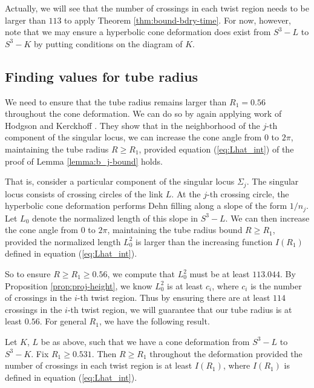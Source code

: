 Actually, we will see that the number of crossings in each twist
region needs to be larger than $113$ to apply Theorem
\ref{thm:bound-bdry-time}.  For now, however, note that we may ensure
a hyperbolic cone deformation does exist from $S^3-L$ to $S^3-K$ by
putting conditions on the diagram of $K$.


\subsection{Finding values for tube radius}
\label{subsec:tube}

We need to ensure that the tube radius remains larger than $R_1 =
0.56$ throughout the cone deformation.  We can do so by again applying
work of Hodgson and Kerckhoff \cite{hk:univ}.  They show that in the
neighborhood of the $j$-th component of the singular locus, we can
increase the cone angle from $0$ to $2\pi$, maintaining the tube
radius $R \geq R_1$, provided equation (\ref{eq:Lhat_int}) of the
proof of Lemma \ref{lemma:b_j-bound} holds.

That is, consider a particular component of the singular locus
$\Sigma_j$.  The singular locus consists of crossing circles of the
link $L$.  At the $j$-th crossing circle, the hyperbolic cone
deformation performs {D}ehn filling along a slope of the form $1/n_j$.
Let $L_0$ denote the normalized length of this slope in $S^3-L$.  We
can then increase the cone angle from $0$ to $2\pi$, maintaining the
tube radius bound $R \geq R_1$, provided the normalized length $L_0^2$
is larger than the increasing function $I(R_1)$ defined in equation
(\ref{eq:Lhat_int}).

So to ensure $R \geq R_1 \geq 0.56$, we compute that $L_0^2$ must be
at least $113.044$.  By Proposition \ref{prop:proj-height}, we know
$L_0^2$ is at least $c_i$, where $c_i$ is the number of crossings in
the $i$-th twist region.  Thus by ensuring there are at least $114$
crossings in the $i$-th twist region, we will guarantee that our tube
radius is at least $0.56$.  For general $R_1$, we have the following
result.

\begin{lemma}
  Let $K$, $L$ be as above, such that we have a cone deformation from
  $S^3-L$ to $S^3-K$.  Fix $R_1 \geq 0.531$.
  Then $R \geq R_1$ throughout the deformation provided the number of
  crossings in each twist region is at least $I(R_1)$, where $I(R_1)$
  is defined in equation (\ref{eq:Lhat_int}).
\label{lemma:crossings-vs-R}
\end{lemma}


